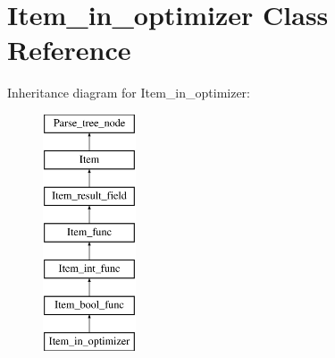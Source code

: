 \hypertarget{classItem__in__optimizer}{}\section{Item\+\_\+in\+\_\+optimizer Class Reference}
\label{classItem__in__optimizer}
Inheritance diagram for Item\+\_\+in\+\_\+optimizer\+:\begin{figure}[H]
\begin{center}
\leavevmode
\includegraphics[height=7.000000cm]{classItem__in__optimizer}
\end{center}
\end{figure}
